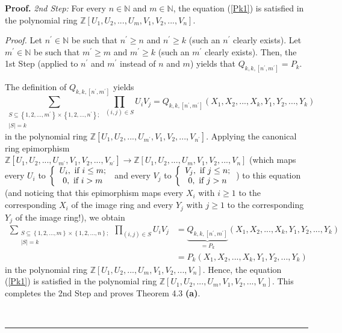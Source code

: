 \documentclass[numbers=enddot,12pt,final,onecolumn,notitlepage]{scrartcl}%
\newenvironment{proof}[1][Proof]{\noindent\textbf{#1.} }{\ \rule{0.5em}{0.5em}}
\begin{document}
\begin{proof}
\textit{2nd Step:} For every $n\in\mathbb{N}$ and $m\in\mathbb{N}$, the
equation (\ref{Pk1}) is satisfied in the polynomial ring $\mathbb{Z}\left[
U_{1},U_{2},...,U_{m},V_{1},V_{2},...,V_{n}\right]  $.

\textit{Proof.} Let $n^{\prime}\in\mathbb{N}$ be such that $n^{\prime}\geq n$
and $n^{\prime}\geq k$ (such an $n^{\prime}$ clearly exists). Let $m^{\prime
}\in\mathbb{N}$ be such that $m^{\prime}\geq m$ and $m^{\prime}\geq k$ (such
an $m^{\prime}$ clearly exists). Then, the 1st Step (applied to $n^{\prime}$
and $m^{\prime}$ instead of $n$ and $m$) yields that $Q_{k,k,\left[
n^{\prime},m^{\prime}\right]  }=P_{k}.$

The definition of $Q_{k,k,\left[  n^{\prime},m^{\prime}\right]  }$ yields
\[
\sum_{\substack{S\subseteq\left\{  1,2,...,m^{\prime}\right\}  \times\left\{
1,2,...,n^{\prime}\right\}  ;\\\left\vert S\right\vert =k}}\prod_{\left(
i,j\right)  \in S}U_{i}V_{j}=Q_{k,k,\left[  n^{\prime},m^{\prime}\right]
}\left(  X_{1},X_{2},...,X_{k},Y_{1},Y_{2},...,Y_{k}\right)
\]
in the polynomial ring $\mathbb{Z}\left[  U_{1},U_{2},...,U_{m^{\prime}}%
,V_{1},V_{2},...,V_{n^{\prime}}\right]  $. Applying the canonical ring
epimorphism $\mathbb{Z}\left[  U_{1},U_{2},...,U_{m^{\prime}},V_{1}%
,V_{2},...,V_{n^{\prime}}\right]  \rightarrow\mathbb{Z}\left[  U_{1}%
,U_{2},...,U_{m},V_{1},V_{2},...,V_{n}\right]  $ (which maps every $U_{i}$ to
$\left\{
\begin{array}
[c]{c}%
U_{i},\text{ if }i\leq m;\\
0,\text{ if }i>m
\end{array}
\right.  $ and every $V_{j}$ to $\left\{
\begin{array}
[c]{c}%
V_{j},\text{ if }j\leq n;\\
0,\text{ if }j>n
\end{array}
\right.  $) to this equation (and noticing that this epimorphism maps every
$X_{i}$ with $i\geq1$ to the corresponding $X_{i}$ of the image ring and every
$Y_{j}$ with $j\geq1$ to the corresponding $Y_{j}$ of the image ring!), we
obtain%
\begin{align*}
\sum_{\substack{S\subseteq\left\{  1,2,...,m\right\}  \times\left\{
1,2,...,n\right\}  ;\\\left\vert S\right\vert =k}}\prod_{\left(  i,j\right)
\in S}U_{i}V_{j}  &  =\underbrace{Q_{k,k,\left[  n^{\prime},m^{\prime}\right]
}}_{=P_{k}}\left(  X_{1},X_{2},...,X_{k},Y_{1},Y_{2},...,Y_{k}\right) \\
&  =P_{k}\left(  X_{1},X_{2},...,X_{k},Y_{1},Y_{2},...,Y_{k}\right)
\end{align*}
in the polynomial ring $\mathbb{Z}\left[  U_{1},U_{2},...,U_{m},V_{1}%
,V_{2},...,V_{n}\right]  $. Hence, the equation (\ref{Pk1}) is satisfied in
the polynomial ring $\mathbb{Z}\left[  U_{1},U_{2},...,U_{m},V_{1}%
,V_{2},...,V_{n}\right]  $. This completes the 2nd Step and proves Theorem 4.3
\textbf{(a)}.


\end{proof}
\end{document}
